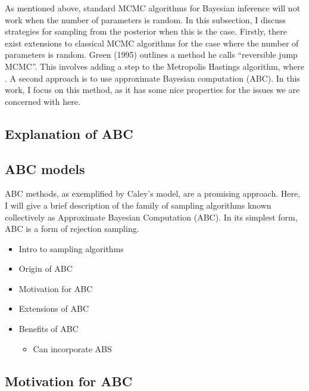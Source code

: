 \documentclass[
]{book}
\providecommand{\tightlist}{%
  \setlength{\itemsep}{0pt}\setlength{\parskip}{0pt}}
\begin{document}
As mentioned above, standard MCMC algorithms for Bayesian inference will not work when the number of parameters is random. In this subsection, I discuss strategies for sampling from the posterior when this is the case. Firstly, there exist extensions to classical MCMC algorithms for the case where the number of parameters is random. Green (1995) outlines a method he calls ``reversible jump MCMC''. This involves adding a step to the Metropolis Hastings algorithm, where . A second approach is to use approximate Bayesian computation (ABC). In this work, I focus on this method, as it has some nice properties for the issues we are concerned with here.

\hypertarget{explanation-of-abc}{%
\subsection{Explanation of ABC}\label{explanation-of-abc}}

\hypertarget{abc-models}{%
\subsection{ABC models}\label{abc-models}}

ABC methods, as exemplified by Caley's model, are a promising approach. Here, I will give a brief description of the family of sampling algorithms known collectively as Approximate Bayesian Computation (ABC). In its simplest form, ABC is a form of rejection sampling.

\begin{itemize}
\tightlist
\item
  Intro to sampling algorithms
\item
  Origin of ABC
\item
  Motivation for ABC
\item
  Extensions of ABC
\item
  Benefits of ABC

  \begin{itemize}
  \tightlist
  \item
    Can incorporate ABS
  \end{itemize}
\end{itemize}

\hypertarget{motivation-for-abc}{%
\subsection{Motivation for ABC}\label{motivation-for-abc}}
\end{document}

